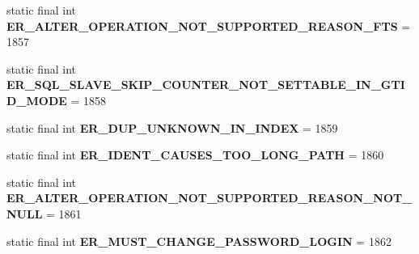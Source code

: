 \begin{DoxyCompactItemize}
\item 
\mbox{\label{classcom_1_1mysql_1_1cj_1_1exceptions_1_1_mysql_error_numbers_a7f768c90fafd5b6446d838c536b72a7d}} 
static final int {\bfseries E\+R\+\_\+\+A\+L\+T\+E\+R\+\_\+\+O\+P\+E\+R\+A\+T\+I\+O\+N\+\_\+\+N\+O\+T\+\_\+\+S\+U\+P\+P\+O\+R\+T\+E\+D\+\_\+\+R\+E\+A\+S\+O\+N\+\_\+\+F\+TS} = 1857
\item 
\mbox{\label{classcom_1_1mysql_1_1cj_1_1exceptions_1_1_mysql_error_numbers_ad51662a38f85ed2c58acac1de3b58c59}} 
static final int {\bfseries E\+R\+\_\+\+S\+Q\+L\+\_\+\+S\+L\+A\+V\+E\+\_\+\+S\+K\+I\+P\+\_\+\+C\+O\+U\+N\+T\+E\+R\+\_\+\+N\+O\+T\+\_\+\+S\+E\+T\+T\+A\+B\+L\+E\+\_\+\+I\+N\+\_\+\+G\+T\+I\+D\+\_\+\+M\+O\+DE} = 1858
\item 
\mbox{\label{classcom_1_1mysql_1_1cj_1_1exceptions_1_1_mysql_error_numbers_a6ab3da0a86330264bbfe52cd9afea5e2}} 
static final int {\bfseries E\+R\+\_\+\+D\+U\+P\+\_\+\+U\+N\+K\+N\+O\+W\+N\+\_\+\+I\+N\+\_\+\+I\+N\+D\+EX} = 1859
\item 
\mbox{\label{classcom_1_1mysql_1_1cj_1_1exceptions_1_1_mysql_error_numbers_a27031c4ec453ee46d073ef513ae71f90}} 
static final int {\bfseries E\+R\+\_\+\+I\+D\+E\+N\+T\+\_\+\+C\+A\+U\+S\+E\+S\+\_\+\+T\+O\+O\+\_\+\+L\+O\+N\+G\+\_\+\+P\+A\+TH} = 1860
\item 
\mbox{\label{classcom_1_1mysql_1_1cj_1_1exceptions_1_1_mysql_error_numbers_abd83c95ce600a287ec76632a0acb2f5b}} 
static final int {\bfseries E\+R\+\_\+\+A\+L\+T\+E\+R\+\_\+\+O\+P\+E\+R\+A\+T\+I\+O\+N\+\_\+\+N\+O\+T\+\_\+\+S\+U\+P\+P\+O\+R\+T\+E\+D\+\_\+\+R\+E\+A\+S\+O\+N\+\_\+\+N\+O\+T\+\_\+\+N\+U\+LL} = 1861
\item 
\mbox{\label{classcom_1_1mysql_1_1cj_1_1exceptions_1_1_mysql_error_numbers_ae6fd17f65df27377e029a22a24003ad2}} 
static final int {\bfseries E\+R\+\_\+\+M\+U\+S\+T\+\_\+\+C\+H\+A\+N\+G\+E\+\_\+\+P\+A\+S\+S\+W\+O\+R\+D\+\_\+\+L\+O\+G\+IN} = 1862
\item 

\end{DoxyCompactItemize}
